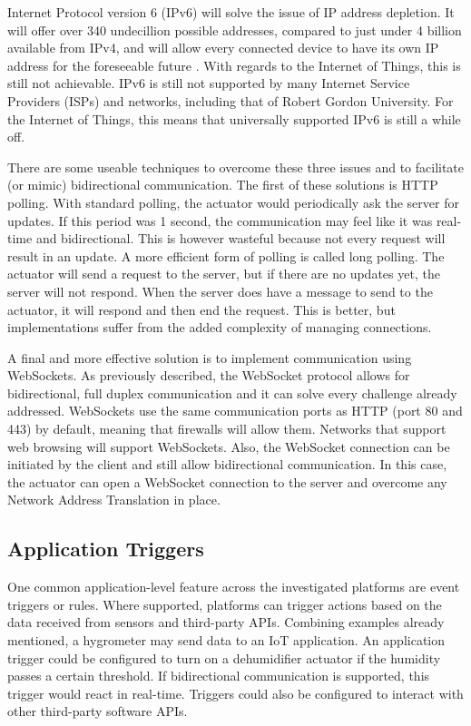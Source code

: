       Internet Protocol version 6 (IPv6) will solve the issue of IP address depletion. It will offer over 340 undecillion possible addresses, compared to just under 4 billion available from IPv4, and will allow every connected device to have its own IP address for the foreseeable future \citep{ipv6:2008}. With regards to the Internet of Things, this is still not achievable. IPv6 is still not supported by many Internet Service Providers (ISPs) and networks, including that of Robert Gordon University. For the Internet of Things, this means that universally supported IPv6 is still a while off.

      There are some useable techniques to overcome these three issues and to facilitate (or mimic) bidirectional communication. The first of these solutions is HTTP polling. With standard polling, the actuator would periodically ask the server for updates. If this period was 1 second, the communication may feel like it was real-time and bidirectional. This is however wasteful because not every request will result in an update. A more efficient form of polling is called long polling. The actuator will send a request to the server, but if there are no updates yet, the server will not respond. When the server does have a message to send to the actuator, it will respond and then end the request. This is better, but implementations suffer from the added complexity of managing connections.

      A final and more effective solution is to implement communication using WebSockets. As previously described, the WebSocket protocol allows for bidirectional, full duplex communication and it can solve every challenge already addressed. WebSockets use the same communication ports as HTTP (port 80 and 443) by default, meaning that firewalls will allow them. Networks that support web browsing will support WebSockets. Also, the WebSocket connection can be initiated by the client and still allow bidirectional communication. In this case, the actuator can open a WebSocket connection to the server and overcome any Network Address Translation in place.

    \subsection{Application Triggers}
      One common application-level feature across the investigated platforms are event triggers or rules. Where supported, platforms can trigger actions based on the data received from sensors and third-party APIs. Combining examples already mentioned, a hygrometer may send data to an IoT application. An application trigger could be configured to turn on a dehumidifier actuator if the humidity passes a certain threshold. If bidirectional communication is supported, this trigger would react in real-time. Triggers could also be configured to interact with other third-party software APIs.

